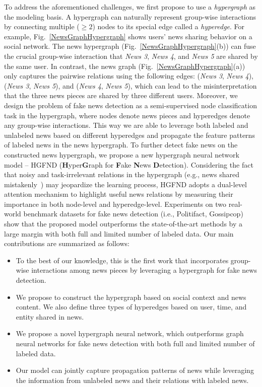 \documentclass[conference]{IEEEtran}
\begin{document}
To address the aforementioned challenges, we first propose to use a \textit{hypergraph} as the modeling basis. A hypergraph can naturally represent group-wise interactions by connecting multiple ($\geq 2$) nodes to its special edge called a \textit{hyperedge}. For example, Fig.~\ref{NewsGraphHypergraph} shows users' news sharing behavior on a social network. The news hypergraph (Fig.~\ref{NewsGraphHypergraph}(b)) can fuse the crucial group-wise interaction that \textit{News 3}, \textit{News 4}, and \textit{News 5} are shared by the same user. In contrast, the news graph (Fig.~\ref{NewsGraphHypergraph}(a)) only captures the pairwise relations using the following edges: (\textit{News 3}, \textit{News 4}), (\textit{News 3}, \textit{News 5}), and (\textit{News 4}, \textit{News 5}), which can lead to the misinterpretation that the three news pieces are shared by three different users. Moreover, we design the problem of fake news detection as a semi-supervised node classification task in the hypergraph, where nodes denote news pieces and hyperedges denote any group-wise interactions. This way we are able to leverage both labeled and unlabeled news based on different hyperedges and propagate the feature patterns of labeled news in the news hypergraph. To further detect fake news on the constructed news hypergraph, we propose a new hypergraph neural network model -- HGFND (\textbf{H}yper\textbf{G}raph for \textbf{F}ake \textbf{N}ews \textbf{D}etection). Considering the fact that noisy and task-irrelevant relations in the hypergraph (e.g., news shared mistakenly~\cite{zhou2022fake}) may jeopardize the learning process, HGFND adopts a dual-level attention mechanism to highlight useful news relations by measuring their importance in both node-level and hyperedge-level. Experiments on two real-world benchmark datasets for fake news detection (i.e., Politifact, Gossipcop) show that the proposed model outperforms the state-of-the-art methods by a large margin with both full and limited number of labeled data. Our main contributions are summarized as follows:


\begin{itemize}
     \item To the best of our knowledge, this is the first work that incorporates group-wise interactions among news pieces by leveraging a hypergraph for fake news detection. 
	\item We propose to construct the hypergraph based on social context and news content. We also define three types of hyperedges based on user, time, and entity shared in news.
	\item We propose a novel hypergraph neural network, which outperforms graph neural networks for fake news detection with both full and limited number of labeled data.
    \item Our model can jointly capture propagation patterns of news while leveraging the  information from unlabeled news and their relations with labeled news.

\end{itemize}
\end{document}
